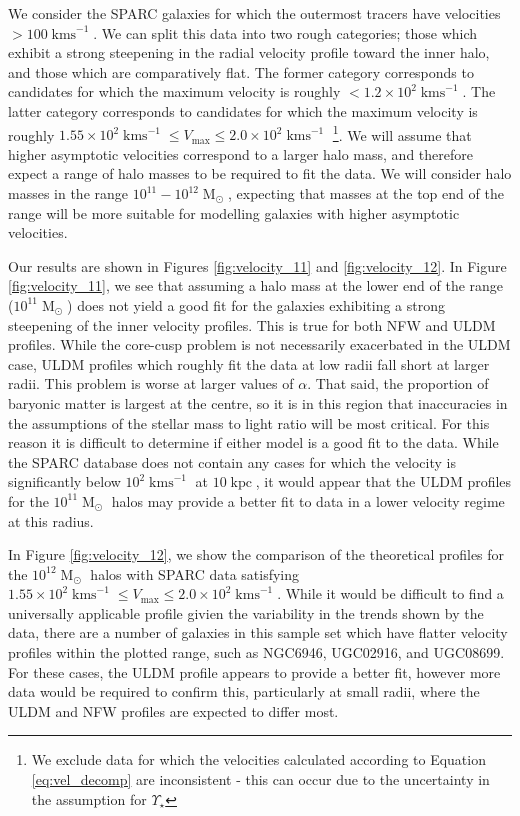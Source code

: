 \documentclass[a4paper,11pt]{article}
\begin{document}
We consider the SPARC galaxies for which the outermost tracers have velocities $>100\operatorname{kms}^{-1}$. We can split this data into two rough categories; those which exhibit a strong steepening in the radial velocity profile toward the inner halo, and those which are comparatively flat. The former category corresponds to candidates for which the maximum velocity is roughly $< 1.2\times 10^2 \operatorname{kms}^{-1}$. The latter category corresponds to candidates for which the maximum velocity is roughly $1.55\times 10^2 \operatorname{kms}^{-1}\leq V_{\mathrm{max}}\leq 2.0\times 10^2 \operatorname{kms}^{-1}$ \footnote{We exclude data for which the velocities calculated according to Equation \ref{eq:vel_decomp} are inconsistent - this can occur due to the uncertainty in the assumption for $\Upsilon_\star$}. We will assume that higher asymptotic velocities correspond to a larger halo mass, and therefore expect a range of halo masses to be required to fit the data. We will consider halo masses in the range $10^{11} - 10^{12} \operatorname{M}_{\odot}$, expecting that masses at the top end of the range will be more suitable for modelling galaxies with higher asymptotic velocities. 

Our results are shown in Figures \ref{fig:velocity_11} and \ref{fig:velocity_12}. In Figure \ref{fig:velocity_11}, we see that assuming a halo mass at the lower end of the range ($10^{11}\operatorname{M}_{\odot}$) does not yield a good fit for the galaxies exhibiting a strong steepening of the inner velocity profiles. This is true for both NFW and ULDM profiles. While the core-cusp problem is not necessarily exacerbated in the ULDM case, ULDM profiles which roughly fit the data at low radii fall short at larger radii. This problem is worse at larger values of $\alpha$. That said, the proportion of baryonic matter is largest at the centre, so it is in this region that inaccuracies in the assumptions of the stellar mass to light ratio will be most critical. For this reason it is difficult to determine if either model is a good fit to the data. While the SPARC database does not contain any cases for which the velocity is significantly below $10^2\operatorname{kms}^{-1}$ at $10 \operatorname{kpc}$, it would appear that the ULDM profiles for the $10^{11}\operatorname{M}_{\odot}$ halos may provide a better fit to data in a lower velocity regime at this radius.



In Figure \ref{fig:velocity_12}, we show the comparison of the theoretical profiles for the $10^{12}\operatorname{M}_{\odot}$ halos with SPARC data satisfying $1.55 \times 10^2 \operatorname{kms}^{-1}\leq V_{\mathrm{max}}\leq 2.0 \times 10^2 \operatorname{kms}^{-1}$. While it would be difficult to find a universally applicable profile givien the variability in the trends shown by the data, there are a number of galaxies in this sample set which have flatter velocity profiles within the plotted range, such as NGC6946, UGC02916, and UGC08699. For these cases, the ULDM profile appears to provide a better fit, however more  data would be required to confirm this, particularly at small radii, where the ULDM and NFW profiles are expected to differ most. 
\end{document}

